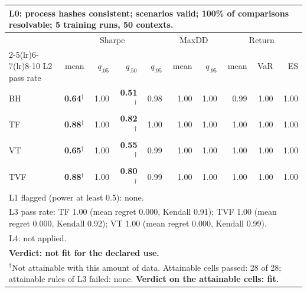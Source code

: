 \begin{tabular}{lrrrrrrrrr}
\toprule
\multicolumn{10}{p{13.5cm}}{L0: process hashes consistent; scenarios valid; 100\% of comparisons resolvable; 5 training runs, 50 contexts.} \\
\midrule
 & \multicolumn{4}{c}{Sharpe} & \multicolumn{2}{c}{MaxDD} & \multicolumn{3}{c}{Return} \\
\cmidrule(lr){2-5}\cmidrule(lr){6-7}\cmidrule(lr){8-10}
L2 pass rate & mean & $q_{.05}$ & $q_{.50}$ & $q_{.95}$ & mean & $q_{.95}$ & mean & VaR & ES \\
\midrule
BH & \textbf{0.64}$^{\dagger}$ & 1.00 & \textbf{0.51}$^{\dagger}$ & 0.98 & 1.00 & 1.00 & 0.99 & 1.00 & 1.00 \\
TF & \textbf{0.88}$^{\dagger}$ & 1.00 & \textbf{0.82}$^{\dagger}$ & 1.00 & 1.00 & 1.00 & 1.00 & 1.00 & 1.00 \\
VT & \textbf{0.65}$^{\dagger}$ & 1.00 & \textbf{0.55}$^{\dagger}$ & 0.99 & 1.00 & 1.00 & 1.00 & 1.00 & 1.00 \\
TVF & \textbf{0.88}$^{\dagger}$ & 1.00 & \textbf{0.80}$^{\dagger}$ & 0.99 & 1.00 & 1.00 & 1.00 & 1.00 & 1.00 \\
\midrule
\multicolumn{10}{p{13.5cm}}{L1 flagged (power at least 0.5): none.} \\
\multicolumn{10}{p{13.5cm}}{L3 pass rate: TF 1.00 (mean regret 0.000, Kendall 0.91); TVF 1.00 (mean regret 0.000, Kendall 0.92); VT 1.00 (mean regret 0.000, Kendall 0.99).} \\
\multicolumn{10}{p{13.5cm}}{L4: not applied.} \\
\multicolumn{10}{p{13.5cm}}{\textbf{Verdict: not fit for the declared use.}} \\
\multicolumn{10}{p{13.5cm}}{$^{\dagger}$Not attainable with this amount of data. Attainable cells passed: 28 of 28; attainable rules of L3 failed: none. \textbf{Verdict on the attainable cells: fit.}} \\
\bottomrule
\end{tabular}
